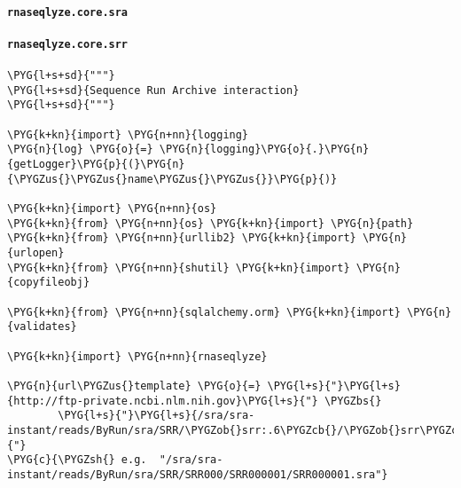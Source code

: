 \paragraph{\texttt{rnaseqlyze.core.sra}}
\label{index-pdf4:rnaseqlyze-core-sra}

\paragraph{\texttt{rnaseqlyze.core.srr}}
\label{index-pdf4:rnaseqlyze-core-srr}
\begin{Verbatim}[commandchars=\\\{\}]
\PYG{l+s+sd}{"""}
\PYG{l+s+sd}{Sequence Run Archive interaction}
\PYG{l+s+sd}{"""}

\PYG{k+kn}{import} \PYG{n+nn}{logging}
\PYG{n}{log} \PYG{o}{=} \PYG{n}{logging}\PYG{o}{.}\PYG{n}{getLogger}\PYG{p}{(}\PYG{n}{\PYGZus{}\PYGZus{}name\PYGZus{}\PYGZus{}}\PYG{p}{)}

\PYG{k+kn}{import} \PYG{n+nn}{os}
\PYG{k+kn}{from} \PYG{n+nn}{os} \PYG{k+kn}{import} \PYG{n}{path}
\PYG{k+kn}{from} \PYG{n+nn}{urllib2} \PYG{k+kn}{import} \PYG{n}{urlopen}
\PYG{k+kn}{from} \PYG{n+nn}{shutil} \PYG{k+kn}{import} \PYG{n}{copyfileobj}

\PYG{k+kn}{from} \PYG{n+nn}{sqlalchemy.orm} \PYG{k+kn}{import} \PYG{n}{validates}

\PYG{k+kn}{import} \PYG{n+nn}{rnaseqlyze}

\PYG{n}{url\PYGZus{}template} \PYG{o}{=} \PYG{l+s}{"}\PYG{l+s}{http://ftp-private.ncbi.nlm.nih.gov}\PYG{l+s}{"} \PYGZbs{}
        \PYG{l+s}{"}\PYG{l+s}{/sra/sra-instant/reads/ByRun/sra/SRR/\PYGZob{}srr:.6\PYGZcb{}/\PYGZob{}srr\PYGZcb{}/\PYGZob{}srr\PYGZcb{}.sra}\PYG{l+s}{"}
\PYG{c}{\PYGZsh{} e.g.  "/sra/sra-instant/reads/ByRun/sra/SRR/SRR000/SRR000001/SRR000001.sra"}


\end{Verbatim}
